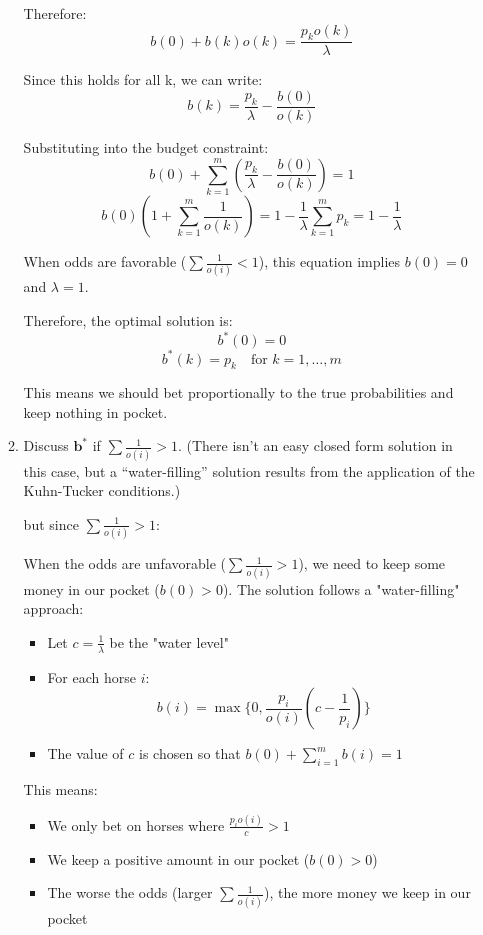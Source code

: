 \documentclass{article}
\begin{document}
\begin{enumerate}
\begin{enumerate}
        Therefore:
        \[
            b(0) + b(k)o(k) = \frac{p_k o(k)}{\lambda}
        \]

        Since this holds for all k, we can write:
        \[
            b(k) = \frac{p_k}{\lambda} - \frac{b(0)}{o(k)}
        \]

        Substituting into the budget constraint:
        \[
            b(0) + \sum_{k=1}^m (\frac{p_k}{\lambda} - \frac{b(0)}{o(k)}) = 1
        \]
        \[
            b(0)(1 + \sum_{k=1}^m \frac{1}{o(k)}) = 1 - \frac{1}{\lambda}\sum_{k=1}^m p_k = 1 - \frac{1}{\lambda}
        \]

        When odds are favorable ($\sum \frac{1}{o(i)} < 1$), this equation implies $b(0) = 0$ and $\lambda = 1$.

        Therefore, the optimal solution is:
        \[
            b^*(0) = 0
        \]
        \[
            b^*(k) = p_k \quad \text{for } k = 1,\ldots,m
        \]

        This means we should bet proportionally to the true probabilities and keep nothing in pocket.

        \item Discuss $\mathbf{b}^*$ if $\sum \frac{1}{o(i)} > 1$. (There isn't an easy closed form solution in this case, but a ``water-filling'' solution results from the application of the Kuhn-Tucker conditions.)
        
        but since $\sum \frac{1}{o(i)} > 1$:
        
        When the odds are unfavorable ($\sum \frac{1}{o(i)} > 1$), we need to keep some money in our pocket ($b(0) > 0$). The solution follows a "water-filling" approach:

        \begin{itemize}
            \item Let $c = \frac{1}{\lambda}$ be the "water level"
            \item For each horse $i$:
                \[
                    b(i) = \max\{0, \frac{p_i}{o(i)}(c - \frac{1}{p_i})\}
                \]
            \item The value of $c$ is chosen so that $b(0) + \sum_{i=1}^m b(i) = 1$
        \end{itemize}
        
        This means:
        \begin{itemize}
            \item We only bet on horses where $\frac{p_i o(i)}{c} > 1$
            \item We keep a positive amount in our pocket ($b(0) > 0$)
            \item The worse the odds (larger $\sum \frac{1}{o(i)}$), the more money we keep in our pocket
        \end{itemize}


\end{enumerate}
\end{enumerate}
\end{document}
